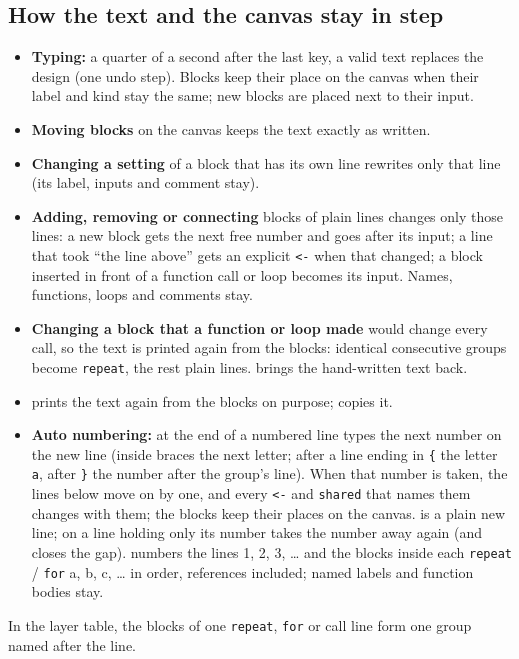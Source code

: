 \subsection{How the text and the canvas stay in step}
\begin{itemize}[nosep]
  \item \textbf{Typing:} a quarter of a second after the last key, a valid text replaces the design (one undo step). Blocks keep their
        place on the canvas when their label and kind stay the same; new blocks are placed next to their input.
  \item \textbf{Moving blocks} on the canvas keeps the text exactly as written.
  \item \textbf{Changing a setting} of a block that has its own line rewrites only that line (its label, inputs and comment stay).
  \item \textbf{Adding, removing or connecting} blocks of plain lines changes only those lines: a new block gets the next free number and
        goes after its input; a line that took ``the line above'' gets an explicit \texttt{<-} when that changed; a block inserted in front
        of a function call or loop becomes its input. Names, functions, loops and comments stay.
  \item \textbf{Changing a block that a function or loop made} would change every call, so the text is printed again from the blocks:
        identical consecutive groups become \texttt{repeat}, the rest plain lines.  brings the hand-written text back.
  \item {} prints the text again from the blocks on purpose;  copies it.
  \item \textbf{Auto numbering:}  at the end of a numbered line types the next number on the new line (inside braces the
        next letter; after a line ending in \texttt{\{} the letter \texttt{a}, after \texttt{\}} the number after the group's line). When
        that number is taken, the lines below move on by one, and every \texttt{<-} and \texttt{shared} that names them changes with
        them; the blocks keep their places on the canvas.  is a plain new line;  on a line holding only its
        number takes the number away again (and closes the gap).  numbers the lines 1, 2, 3, \dots{} and the blocks inside
        each \texttt{repeat} / \texttt{for} a, b, c, \dots{} in order, references included; named labels and function bodies stay.
\end{itemize}
In the layer table, the blocks of one \texttt{repeat}, \texttt{for} or call line form one group named after the line.

